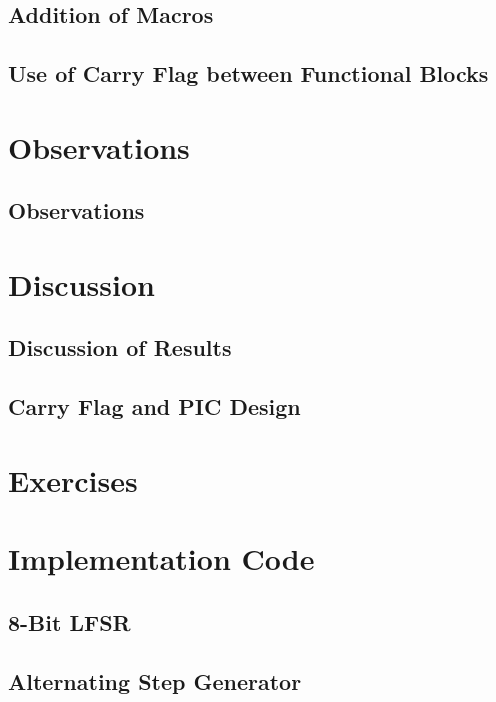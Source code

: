 \documentclass[11pt]{article}
\begin{document}
\subsection{Addition of Macros}

\subsection{Use of Carry Flag between Functional Blocks}

\section{Observations}

\subsection{Observations}

\section{Discussion}

\subsection{Discussion of Results}

\subsection{Carry Flag and PIC Design}

\section{Exercises}

\clearpage
\section{Implementation Code}

\subsection{8-Bit LFSR}
\label{lsfr-code}




\clearpage
\subsection{Alternating Step Generator}
\label{asg-code}


\end{document}
